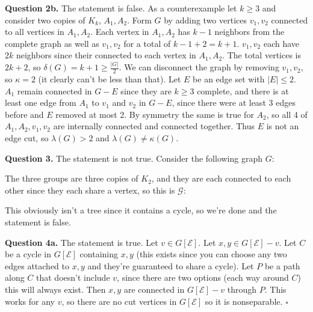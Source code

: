 \documentclass[letterpaper, reqno,11pt]{article}
\begin{document}
{\medskip\noindent\bf Question 2b.} The statement is false. As a counterexample let $k\geq 3$ and consider two copies of $K_k$, $A_1,A_2$. Form $G$ by adding two vertices $v_1,v_2$ connected to all vertices in $A_1,A_2$. Each vertex in $A_1,A_2$ has $k-1$ neighbors from the complete graph as well as $v_1,v_2$ for a total of $k-1+2=k+1$. $v_1,v_2$ each have $2k$ neighbors since their connected to each vertex in $A_1,A_2$. The total vertices is $2k+2$, so $\delta(G)=k+1\geq \frac{|G|}{2}$. We can disconnect the graph by removing $v_1,v_2$, so $\kappa=2$ (it clearly can't be less than that). Let $E$ be an edge set with $|E|\leq 2$. $A_1$ remain connected in $G-E$ since they are $k\geq 3$ complete, and there is at least one edge from $A_1$ to $v_1$ and $v_2$ in $G-E$, since there were at least $3$ edges before and $E$ removed at most 2. By symmetry the same is true for $A_2$, so all 4 of $A_1,A_2,v_1,v_2$ are internally connected and connected together. Thus $E$ is not an edge cut, so $\lambda(G)>2$ and $\lambda(G)\neq \kappa(G)$.  

{\medskip\noindent\bf Question 3.} The statement is not true. Consider the following graph $G$: 

\begin{center}
\end{center}

The three groups are three copies of $K_2$, and they are each connected to each other since they each share a vertex, so this is $\mathcal{G}$: 

\begin{center}
\end{center}

This obviously isn't a tree since it contains a cycle, so we're done and the statement is false. 

{\medskip\noindent\bf Question 4a.} The statement is true. Let $v\in G[\mathcal{E}]$. Let $x,y\in G[\mathcal{E}]-v$. Let $C$ be a cycle in $G[\mathcal E]$ containing $x,y$ (this exists since you can choose any two edges attached to $x,y$ and they're guaranteed to share a cycle). Let $P$ be a path along $C$ that doesn't include $v$, since there are two options (each way around $C$) this will always exist. Then $x,y$ are connected in $G[\mathcal{E}]-v$ through $P$. This works for any $v$, so there are no cut vertices in $G[\mathcal{E}]$ so it is nonseparable. $\square$
\end{document}
